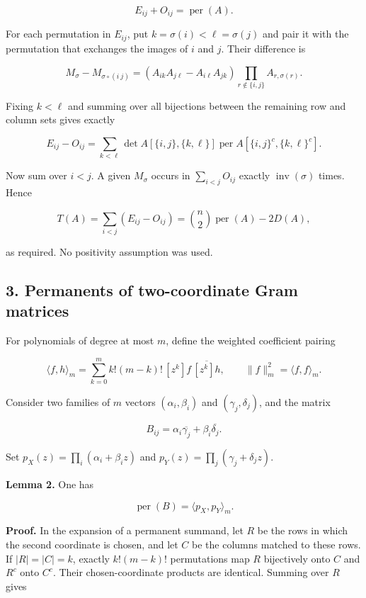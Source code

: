 \documentclass[10pt,a4paper]{article}
\begin{document}
\nopagebreak[4]
\[
E_{ij}+O_{ij}=\operatorname{per}(A).
\]

For each permutation in \(E_{ij}\), put \(k=\sigma(i)<\ell=\sigma(j)\)
and pair it with the permutation that exchanges the images of \(i\) and
\(j\). Their difference is

\nopagebreak[4]
\[
M_\sigma-M_{\sigma\circ(i\ j)}
=(A_{ik}A_{j\ell}-A_{i\ell}A_{jk})
                    \prod_{r\notin\{i,j\}}A_{r,\sigma(r)}.
\]

Fixing \(k<\ell\) and summing over all bijections between the remaining
row and column sets gives exactly

\nopagebreak[4]
\[
E_{ij}-O_{ij}
=\sum_{k<\ell}\det A[\{i,j\},\{k,\ell\}]
             \operatorname{per}A[\{i,j\}^c,\{k,\ell\}^c].
\]

Now sum over \(i<j\). A given \(M_\sigma\) occurs in
\(\sum_{i<j}O_{ij}\) exactly \(\operatorname{inv}(\sigma)\) times. Hence

\nopagebreak[4]
\[
T(A)=\sum_{i<j}(E_{ij}-O_{ij})
=\binom n2\operatorname{per}(A)-2D(A),
\]

as required. No positivity assumption was used.

\newpage
\subsection{3. Permanents of two-coordinate Gram
matrices}\label{permanents-of-two-coordinate-gram-matrices}

For polynomials of degree at most \(m\), define the weighted coefficient
pairing

\nopagebreak[4]
\[
\langle f,h\rangle_m
=\sum_{k=0}^{m}k!(m-k)!\,[z^k]f\,\overline{[z^k]h},
\qquad \|f\|_m^2=\langle f,f\rangle_m.
\tag{6}
\]

Consider two families of \(m\) vectors \((\alpha_i,\beta_i)\) and
\((\gamma_j,\delta_j)\), and the matrix

\nopagebreak[4]
\[
B_{ij}=\alpha_i\overline{\gamma_j}+\beta_i\overline{\delta_j}.
\]

Set \(p_X(z)=\prod_i(\alpha_i+\beta_i z)\) and
\(p_Y(z)=\prod_j(\gamma_j+\delta_j z)\).

\textbf{Lemma 2.} One has

\nopagebreak[4]
\[
\operatorname{per}(B)=\langle p_X,p_Y\rangle_m.
\tag{7}
\]

\textbf{Proof.} In the expansion of a permanent summand, let \(R\) be
the rows in which the second coordinate is chosen, and let \(C\) be the
columns matched to these rows. If \(|R|=|C|=k\), exactly \(k!(m-k)!\)
permutations map \(R\) bijectively onto \(C\) and \(R^c\) onto \(C^c\).
Their chosen-coordinate products are identical. Summing over \(R\) gives
\end{document}
